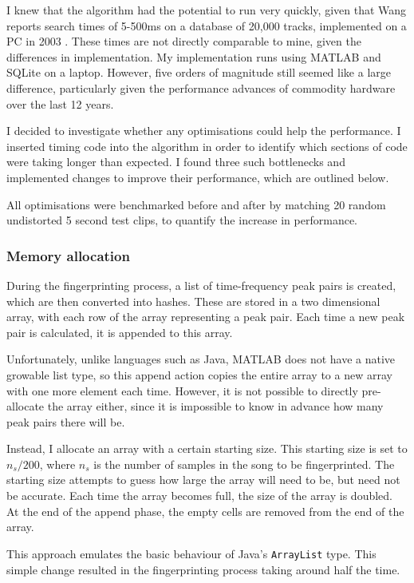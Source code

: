 \documentclass[12pt,a4paper,twoside,openright]{report}
\begin{document}
I knew that the algorithm had the potential to run very quickly, given that Wang reports search times of 5-500ms on a database of 20,000 tracks, implemented on a PC in 2003 \cite{Wang03}. These times are not directly comparable to mine, given the differences in implementation. My implementation runs using MATLAB and SQLite on a laptop. However, five orders of magnitude still seemed like a large difference, particularly given the performance advances of commodity hardware over the last 12 years.

I decided to investigate whether any optimisations could help the performance. I inserted timing code into the algorithm in order to identify which sections of code were taking longer than expected. I found three such bottlenecks and implemented changes to improve their performance, which are outlined below.

All optimisations were benchmarked before and after by matching 20 random undistorted 5 second test clips, to quantify the increase in performance.


\subsubsection{Memory allocation}

During the fingerprinting process, a list of time-frequency peak pairs is created, which are then converted into hashes. These are stored in a two dimensional array, with each row of the array representing a peak pair. Each time a new peak pair is calculated, it is appended to this array.

Unfortunately, unlike languages such as Java, MATLAB does not have a native growable list type, so this append action copies the entire array to a new array with one more element each time. However, it is not possible to directly pre-allocate the array either, since it is impossible to know in advance how many peak pairs there will be.

Instead, I allocate an array with a certain starting size. This starting size is set to $n_s/200$, where $n_s$ is the number of samples in the song to be fingerprinted. The starting size attempts to guess how large the array will need to be, but need not be accurate. Each time the array becomes full, the size of the array is doubled. At the end of the append phase, the empty cells are removed from the end of the array.

This approach emulates the basic behaviour of Java's \lstinline{ArrayList} type. This simple change resulted in the fingerprinting process taking around half the time.
\end{document}
